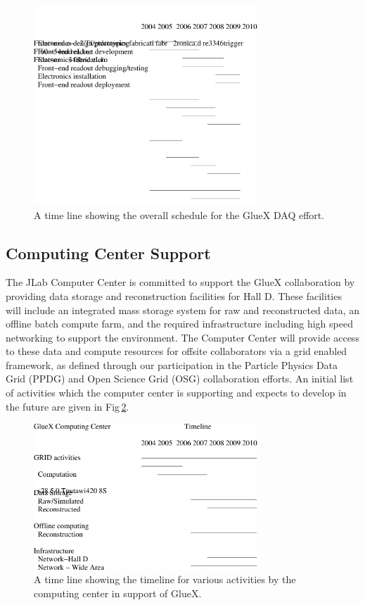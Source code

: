\documentclass[oneside,12pt,letterpaper]{article}
\begin{document}
\begin{figure}[h!]\centering
\includegraphics[width=0.75\textwidth]{daq_timeline.pdf}
\caption[]{\label{fig:daq_timeline}A time line showing the 
overall schedule for the GlueX DAQ effort.}
\end{figure}

\subsection{Computing Center Support}
The JLab Computer Center is committed to support the GlueX collaboration by providing data 
storage and reconstruction facilities for Hall D. These facilities will include an integrated 
mass storage system for raw and reconstructed data, an offline batch compute farm, and 
the required infrastructure including high speed networking to support the environment. 
The Computer Center will provide access to these data and compute resources for offsite 
collaborators via a grid enabled framework, as defined through our participation in the 
Particle Physics Data Grid (PPDG) and Open Science Grid (OSG) collaboration efforts.
An initial list of
activities which the computer center is supporting and expects to develop
in the future are given in Fig\,\ref{fig:cc_timeline}.

\begin{figure}[h!]\centering
\includegraphics[width=0.75\textwidth]{cc_timeline.pdf}
\caption[]{\label{fig:cc_timeline} A time line showing the 
timeline for various activities by the computing
center in support of GlueX.}
\end{figure}
\end{document}
